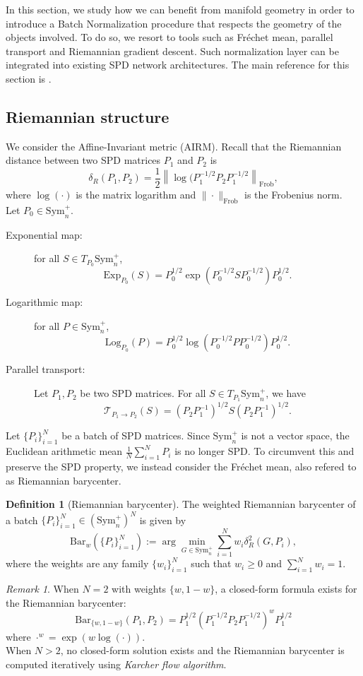 \documentclass[10pt,a4paper]{book}
\theoremstyle{definition}
\newtheorem{defn}{Definition}[section]
\theoremstyle{plain}
\theoremstyle{remark}
\newtheorem{rmk}{Remark}[section]
\begin{document}
In this section, we study how we can benefit from manifold geometry in order to introduce a Batch Normalization procedure that respects the geometry of the objects involved. 
To do so, we resort to tools such as Fréchet mean, parallel transport and Riemannian gradient descent. 
Such normalization layer can be integrated into existing SPD network architectures. 
The main reference for this section is \cite{brooks2019riemannian}.
\subsection{Riemannian structure}
We consider the Affine-Invariant metric (AIRM). Recall that the Riemannian distance between two SPD matrices $P_1$ and $P_2$ is
$$\delta_{R}(P_1,P_2)=\frac{1}{2}\left\|\log(P_1^{-1/2}P_2P_1^{-1/2}\right\|_{\text{Frob}},$$
where $\log(\cdot)$ is the matrix logarithm and $\|\cdot\|_{\text{Frob}}$ is the Frobenius norm. 
\\ Let $P_0\in \text{Sym}_{n}^{+}$. 
\begin{description}
\item[Exponential map:] for all $S\in T_{P_0}\text{Sym}_n^{+}$, 
$$\text{Exp}_{P_0}(S)=P_0^{1/2}\exp(P_0^{-1/2}SP_0^{-1/2})P_0^{1/2}.$$
\item[Logarithmic map:] for all $P\in \text{Sym}_n^{+}$, 
$$\text{Log}_{P_0}(P)=P_0^{1/2}\log(P_0^{-1/2}PP_0^{-1/2})P_0^{1/2}.$$
\item[Parallel transport:] Let $P_1, P_2$ be two SPD matrices. For all $S\in T_{P_1}\text{Sym}_{n}^{+}$, we have
$$\mathcal{T}_{P_1\to P_2}(S)=(P_2P_1^{-1})^{1/2}S(P_2P_1^{-1})^{1/2}.$$ 
\end{description}
Let $\{P_i\}_{i=1}^{N}$ be a batch of SPD matrices. Since $\text{Sym}_n^{+}$ is not a vector space, the Euclidean arithmetic mean $\frac{1}{N}\sum_{i=1}^{N}P_i$ is no longer SPD. To circumvent this and preserve the SPD property, we instead consider the Fréchet mean, also refered to as Riemannian barycenter.

\begin{defn}[Riemannian barycenter]
The weighted Riemannian barycenter of a batch $\{P_i\}_{i=1}^{N} \in (\text{Sym}_n^{+})^{N}$ is given by
$$\text{Bar}_{w}(\{P_i\}_{i=1}^{N}):=\arg \min_{G\in \text{Sym}_n^{+}}\sum_{i=1}^{N}w_i\delta_R^{2}(G,P_i),$$
where the weights are any family $\{w_i\}_{i=1}^{N}$ such that $w_i\ge 0$ and $\sum_{i=1}^{N}w_i=1$.
\end{defn}
\begin{rmk}
When $N=2$ with weights $\{w,1-w\}$, a closed-form formula exists for the Riemannian barycenter:
$$\text{Bar}_{\{w,1-w\}}(P_1,P_2)=P_1^{1/2}(P_1^{-1/2}P_2P_1^{-1/2})^{w}P_1^{1/2}$$
where $\cdot^{w}=\exp(w \log(\cdot))$.\\
When $N>2$, no closed-form solution exists and the Riemannian barycenter is computed iteratively using \emph{Karcher flow algorithm}. 
\end{rmk}
\end{document}
